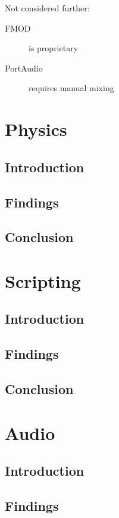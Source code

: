 \documentclass{projdoc}
\begin{document}
Not considered further:
\begin{description}
	\item[FMOD] is proprietary
	\item[PortAudio] requires manual mixing
\end{description}

\section{Physics}

\subsection{Introduction}

\subsection{Findings}

\subsection{Conclusion}

\section{Scripting}

\subsection{Introduction}

\subsection{Findings}

\subsection{Conclusion}

\section{Audio}

\subsection{Introduction}

\subsection{Findings}
\end{document}
